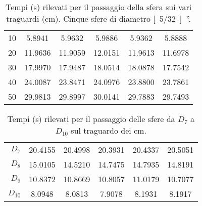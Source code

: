 \begin{table}[hp]\caption{Tempi (\unit{s}) rilevati per il passaggio della sfera sui vari traguardi (\unit{cm}). Cinque sfere di diametro \unit[5/32]{''}.}
\centering \small
\begin{tabular}{r*5c}
10 &5.8941 &5.9632 &5.9886 &5.9362 &5.8888\\
20 &11.9636 &11.9059 &12.0151 &11.9613 &11.6978\\
30 &17.9970 &17.9487 &18.0514 &18.0878 &17.7542\\
40 &24.0087 &23.8471 &24.0976 &23.8800 &23.7861\\
50 &29.9813 &29.8997 &30.0141 &29.7883 &29.7493
\end{tabular}
\end{table}
\begin{table}[hp]\caption{Tempi (\unit{s}) rilevati per il passaggio delle sfere da $D_7$ a $D_{10}$ sul traguardo dei \unit[50]{cm}.}
\centering \small
\begin{tabular}{r*5c}
$D_7$ &20.4155 &20.4998 &20.3931 &20.4337 &20.5051\\
$D_8$ &15.0105 &14.5210 &14.7475 &14.7935 &14.8191\\
$D_9$ &10.8372 &10.8669 &10.8057 &11.0179 &10.7077\\
$D_{10}$ &8.0948 &8.0813 &7.9078 &8.1931 &8.1917
\end{tabular}
\end{table}